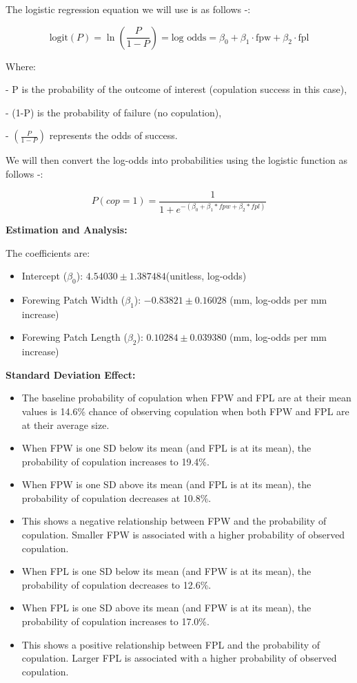 \documentclass[
]{article}
\providecommand{\tightlist}{%
  \setlength{\itemsep}{0pt}\setlength{\parskip}{0pt}}
\begin{document}
The logistic regression equation we will use is as follows -:

\[
\text{logit}(P) = \ln\left(\frac{P}{1-P}\right) = \text{log odds} = \beta_0 + \beta_1 \cdot \text{fpw} + \beta_2 \cdot \text{fpl}
\]

Where:

- P is the probability of the outcome of interest (copulation success in
this case),

- (1-P) is the probability of failure (no copulation),

- \((\frac{P}{1-P})\) represents the odds of success.

We will then convert the log-odds into probabilities using the logistic
function as follows -:

\[
P(cop=1) = \frac{1}{1+e^{-(\beta_0+\beta_1*fpw+\beta_2*fpl)}}
\]

\textbf{Estimation and Analysis:}

The coefficients are:

\begin{itemize}
\tightlist
\item
  Intercept (\(\beta_0\)): \(4.54030\pm1.387484\)(unitless, log-odds)
\item
  Forewing Patch Width (\(\beta_1\)): \(-0.83821\pm0.16028\) (mm,
  log-odds per mm increase)
\item
  Forewing Patch Length (\(\beta_2\)): \(0.10284\pm0.039380\) (mm,
  log-odds per mm increase)
\end{itemize}

\textbf{Standard Deviation Effect:}

\begin{itemize}
\tightlist
\item
  The baseline probability of copulation when FPW and FPL are at their
  mean values is 14.6\% chance of observing copulation when both FPW and
  FPL are at their average size.
\item
  When FPW is one SD below its mean (and FPL is at its mean), the
  probability of copulation increases to 19.4\%.
\item
  When FPW is one SD above its mean (and FPL is at its mean), the
  probability of copulation decreases at 10.8\%.
\item
  This shows a negative relationship between FPW and the probability of
  copulation. Smaller FPW is associated with a higher probability of
  observed copulation.
\item
  When FPL is one SD below its mean (and FPW is at its mean), the
  probability of copulation decreases to 12.6\%.
\item
  When FPL is one SD above its mean (and FPW is at its mean), the
  probability of copulation increases to 17.0\%.
\item
  This shows a positive relationship between FPL and the probability of
  copulation. Larger FPL is associated with a higher probability of
  observed copulation.
\end{itemize}
\end{document}
